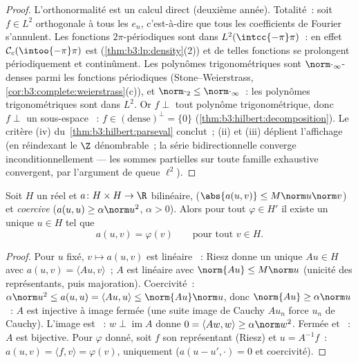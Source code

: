\begin{proof}
L'orthonormalité est un calcul direct (deuxième année).
Totalité~: soit $f \in L^2$ orthogonale à tous les $e_n$,
c'est-à-dire que tous les coefficients de Fourier s'annulent.
Les fonctions  $2\pi$-périodiques sont  dans
$L^2(\intcc{-\pi}\pi)$~: en effet $\mathcal
C_c(\intoo{-\pi}\pi)$ est 
(\cref{thm:b3:lp:density}(2)) et de telles fonctions se
prolongent périodiquement et continûment. Les polynômes
trigonométriques sont $\norm\cdot_\infty$-denses parmi les
fonctions  périodiques (Stone--Weierstrass,
\cref{cor:b3:complete:weierstrass}(c)), et $\norm\cdot_2 \leq
\norm\cdot_\infty$~: les polynômes trigonométriques sont
 dans $L^2$. Or $f \perp$ tout polynôme
trigonométrique, donc $f \perp$ un sous-espace ~: $f
\in (\text{dense})^\perp = \{0\}$
(\cref{thm:b3:hilbert:decomposition}). Le critère (iv) du~\cref{thm:b3:hilbert:parseval} conclut~; (ii) et (iii)
déplient l'affichage (en réindexant le $\Z$ dénombrable~; la
série bidirectionnelle converge inconditionnellement --- les
sommes partielles sur toute famille exhaustive convergent,
par l'argument de queue $\ell^2$).
\end{proof}

\begin{theorem}\label{thm:b3:hilbert:laxmilgram}
Soit $H$ un  réel et $a \colon H\times H \to
\R$ bilinéaire, \emph{} ($\abs{a(u,v)} \leq M\norm
u\norm v$) et \emph{coercive} ($a(u, u) \geq \alpha\norm u^2$,
$\alpha > 0$). Alors pour tout $\varphi \in H'$ il existe un
unique $u \in H$ tel que
\[
a(u, v) = \varphi(v) \qquad \text{pour tout } v \in H .
\]
\end{theorem}

\begin{proof}
Pour $u$ fixé, $v \mapsto a(u, v)$ est linéaire ~:
Riesz donne un unique $Au \in H$ avec $a(u,v) = \langle Au,
v\rangle$~; $A$ est linéaire avec $\norm{Au} \leq M\norm u$
(unicité des représentants, puis majoration). Coercivité~:
$\alpha\norm u^2 \leq a(u,u) = \langle Au, u\rangle \leq
\norm{Au}\norm u$, donc $\norm{Au} \geq \alpha\norm u$~: $A$
est injective à image fermée (une suite image de Cauchy $Au_n$
force $u_n$ de Cauchy). L'image est ~: $w \perp
\operatorname{im}A$ donne $0 = \langle Aw, w\rangle \geq
\alpha\norm w^2$. Fermée et ~: $A$ est bijective. Pour
$\varphi$ donné, soit $f$ son représentant (Riesz) et $u =
A^{-1}f$~: $a(u, v) = \langle f, v\rangle = \varphi(v)$,
uniquement ($a(u - u', \cdot) = 0$ et coercivité).
\end{proof}

